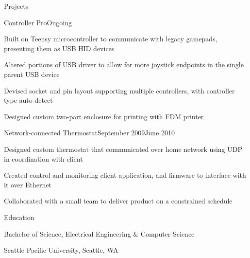 \documentclass[letterpaper,10pt]{article}
\begin{document}
\begin{res_section}{Projects}
    \begin{res_experienceitem}{Controller Pro}{}{}{Ongoing}{}
        \item Built on Teensy microcontroller to communicate with legacy gamepads, presenting them as USB HID devices
        \item Altered portions of USB driver to allow for more joystick endpoints in the single parent USB device
        \item Devised socket and pin layout supporting multiple controllers, with controller type auto-detect
        \item Designed custom two-part enclosure for printing with FDM printer
    \end{res_experienceitem}
    \begin{res_experienceitem}{Network-connected Thermostat}{}{}{September 2009}{June 2010}
        \item Designed custom thermostat that communicated over home network using UDP in coordination with client
        \item Created control and monitoring client application, and firmware to interface with it over Ethernet
        \item Collaborated with a small team to deliver product on a constrained schedule
    \end{res_experienceitem}
\end{res_section}

\begin{res_section}{Education}
\begin{res_subsection}{Bachelor of Science, Electrical Engineering \& Computer Science}
    \item Seattle Pacific University, Seattle, WA
\end{res_subsection}
\end{res_section}
\end{document}
